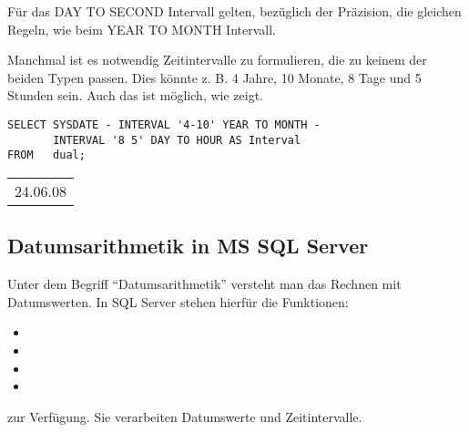           \begin{merke}
            Für das DAY TO SECOND Intervall gelten, bezüglich der
            Präzision, die gleichen Regeln, wie beim YEAR TO MONTH Intervall.
          \end{merke}
          Manchmal ist es notwendig Zeitintervalle zu formulieren, die zu keinem
          der beiden Typen passen. Dies könnte z. B. 4 Jahre, 10 Monate, 8
          Tage und 5 Stunden sein. Auch das ist möglich, wie
           zeigt.
\clearpage
          \begin{lstlisting}[language=oracle_sql,caption={Ein komplexe Zeitintervall},label=sql03_21]
SELECT SYSDATE - INTERVAL '4-10' YEAR TO MONTH -
       INTERVAL '8 5' DAY TO HOUR AS Interval
FROM   dual;
          \end{lstlisting}
          \begin{center}
            \begin{small}
              \tablehead{}
              \begin{oraclesql}
                \begin{supertabular}{l}
                  24.06.08 \\
                \end{supertabular}
              \end{oraclesql}
            \end{small}
          \end{center}
      \subsection{Datumsarithmetik in MS SQL Server}
        Unter dem Begriff \enquote{Datumsarithmetik} versteht man das Rechnen mit Datumswerten. In SQL Server stehen hierfür die Funktionen:
        \begin{itemize}
          \item {}
          \item {}
          \item {}
          \item {}
        \end{itemize}
        zur Verfügung. Sie verarbeiten Datumswerte und Zeitintervalle.


